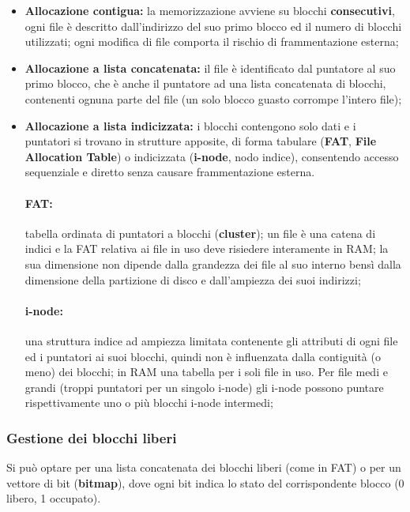\documentclass{article}
\begin{document}
\begin{itemize}
    \item \textbf{Allocazione contigua:} la memorizzazione avviene su blocchi \textbf{consecutivi}, ogni file è descritto dall'indirizzo del suo primo blocco ed il numero di blocchi utilizzati; ogni modifica di file comporta il rischio di frammentazione esterna;
    \item \textbf{Allocazione a lista concatenata:} il file è identificato dal puntatore al suo primo blocco, che è anche il puntatore ad una lista concatenata di blocchi, contenenti ognuna parte del file (un solo blocco guasto corrompe l'intero file);
    \item \textbf{Allocazione a lista indicizzata:} i blocchi contengono solo dati e i puntatori si trovano in strutture apposite, di forma tabulare (\textbf{FAT}, \textbf{File Allocation Table}) o indicizzata (\textbf{i-node}, nodo indice), consentendo accesso sequenziale e diretto senza causare frammentazione esterna. 
    
\paragraph{FAT:}tabella ordinata di puntatori a blocchi (\textbf{cluster}); un file è una catena di indici e la FAT relativa ai file in uso deve risiedere interamente in RAM; la sua dimensione non dipende dalla grandezza dei file al suo interno bensì dalla dimensione della partizione di disco e dall'ampiezza dei suoi indirizzi;

\paragraph{i-node:}una struttura indice ad ampiezza limitata contenente gli attributi di ogni file ed i puntatori ai suoi blocchi, quindi non è influenzata dalla contiguità (o meno) dei blocchi; in RAM una tabella per i soli file in uso. Per file medi e grandi (troppi puntatori per un singolo i-node) gli i-node possono puntare rispettivamente uno o più blocchi i-node intermedi;

\end{itemize}

\subsubsection{Gestione dei blocchi liberi} Si può optare per una lista concatenata dei blocchi liberi (come in FAT) o per un vettore di bit (\textbf{bitmap}), dove ogni bit indica lo stato del corrispondente blocco (0 libero, 1 occupato).
\end{document}
